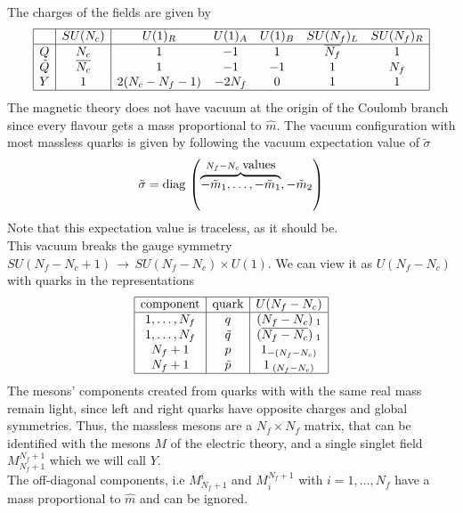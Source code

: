 The charges of the fields are given by
\begin{equation}
\begin{array}{| c | c | c c c c c| }
 \hline 
  & SU(N_c) & U(1)_R & U(1)_A & U(1)_B  & SU(N_f)_L & SU(N_f)_R \\
 \hline

 Q &N_c & 1 & -1 & 1 & \overline{N_f} & 1 \\  
 \tilde{Q}& \overline{N_c} & 1  & -1 & -1  & 1 & {N_f}  \\  
 Y & 1 & 2(N_c - N_f -1 ) & -2 N_f  & 0 &  1 & 1 \\
 \hline
\end{array}
\end{equation}
The magnetic theory does not have vacuum at the origin of the Coulomb branch since every flavour gets a mass proportional to $\hat{m}$.
The vacuum configuration with most massless quarks is given by following the vacuum expectation value of $\tilde{\sigma}$
\begin{equation}
  \tilde{\sigma} = \hbox{diag\,} \left( \overbrace{- \tilde{m}_1, \dotsc,-\tilde{m}_1}^{N_f - N_c \; \hbox{values}}, -\tilde{m}_2  \right)
 \end{equation}
Note that this expectation value is traceless, as it should be.\\
This vacuum breaks the gauge symmetry $SU(N_f-N_c + 1) \, \rightarrow \, SU(N_f - N_c) \times U(1)$. 
We can view it as $U(N_f - N_c)$ with quarks in the representations
\begin{equation}
\begin{array} { | c | c | c | }
 \hline
 \hbox{component}& \hbox{quark} & U(N_f - N_c)  \\
\hline
1,\dotsc,N_f & q & (N_f - N_c)_{\;1}\\
1,\dotsc,N_f & \tilde{q} & (\overline{N_f - N_c})_{\;1}\\
N_f +1 & p & 1_{-(N_f-N_c)}\\
N_f +1 & \tilde{p} & 1_{\;(N_f-N_c)}\\ 
\hline
\end{array}
\end{equation}
The mesons' components created from quarks with with the same real mass remain light, since left and right quarks have opposite charges and global symmetries. 
Thus, the massless mesons are a $N_f \times N_f$ matrix, that can be identified with the mesons $M$ of the electric theory, and a single singlet field $M^{N_f+1}_{N_f+1}$ which we will call $Y$.\\
The off-diagonal components, i.e $M^i_{N_f+1}$ and $M^{N_f+1}_i$ with $i=1,\dotsc,N_f$ have a mass proportional to $\hat{m}$ and can be ignored.\\
